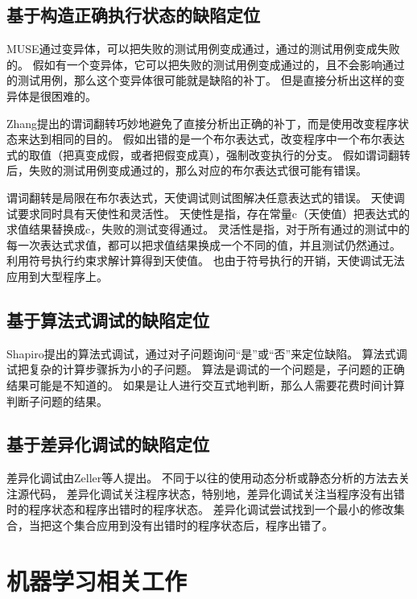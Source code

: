 \subsection{基于构造正确执行状态的缺陷定位}

MUSE通过变异体，可以把失败的测试用例变成通过，通过的测试用例变成失败的。
假如有一个变异体，它可以把失败的测试用例变成通过的，且不会影响通过的测试用例，那么这个变异体很可能就是缺陷的补丁。
但是直接分析出这样的变异体是很困难的。

Zhang提出的谓词翻转\parencite{Zhang2006Locating}巧妙地避免了直接分析出正确的补丁，而是使用改变程序状态来达到相同的目的。
假如出错的是一个布尔表达式，改变程序中一个布尔表达式的取值（把真变成假，或者把假变成真），强制改变执行的分支。
假如谓词翻转后，失败的测试用例变成通过的，那么对应的布尔表达式很可能有错误。

谓词翻转是局限在布尔表达式，天使调试\parencite{Chandra2011Angelic}则试图解决任意表达式的错误。
天使调试要求同时具有天使性和灵活性。
天使性是指，存在常量c（天使值）把表达式的求值结果替换成c，失败的测试变得通过。
灵活性是指，对于所有通过的测试中的每一次表达式求值，都可以把求值结果换成一个不同的值，并且测试仍然通过。
利用符号执行约束求解计算得到天使值。
也由于符号执行的开销，天使调试无法应用到大型程序上。

\subsection{基于算法式调试的缺陷定位}

Shapiro提出的算法式调试\parencite{Shapiro1982Algorithmic}，通过对子问题询问“是”或“否”来定位缺陷。
算法式调试把复杂的计算步骤拆为小的子问题。
算法是调试的一个问题是，子问题的正确结果可能是不知道的。
如果是让人进行交互式地判断，那么人需要花费时间计算判断子问题的结果。

\subsection{基于差异化调试的缺陷定位}

差异化调试由Zeller等人提出\parencite{Zeller2002Isolating,Zeller2002Simplifying}。
不同于以往的使用动态分析或静态分析的方法去关注源代码，
差异化调试关注程序状态，特别地，差异化调试关注当程序没有出错时的程序状态和程序出错时的程序状态。
差异化调试尝试找到一个最小的修改集合，当把这个集合应用到没有出错时的程序状态后，程序出错了。

\section{机器学习相关工作}

